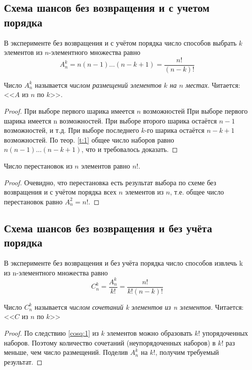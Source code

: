 \subsection{Схема шансов без возвращения и с учетом порядка}
\begin{theorem}
В эксперименте без возвращения и с учётом порядка число способов выбрать $k$ элементов из $n$-элементного множества равно
\begin{equation*}
	A_n^k=n(n-1)\dots(n-k+1)=\frac{n!}{(n-k)!}
\end{equation*}
\end{theorem}
Число $A_n^k$ называется \textit{числом размещений элементов $k$ на $n$ местах}. Читается: <<$A$ из $n$ по $k$>>.  

\begin{proof}
При выборе первого шарика имеется $n$ возможностей При выборе первого шарика имеется n возможностей. При выборе второго шарика остаётся $n−1$ возможностей, и т.д. При выборе последнего $k$-го шарика остаётся $n − k + 1$ возможностей. По теор. \ref{t:1} общее
число наборов равно $n(n−1)\dots(n−k +1)$, что и требовалось доказать.
\end{proof}

\begin{consq}
\label{cosq:1}
Число перестановок из $n$ элементов равно $n!$.
\end{consq}

\begin{proof}
Очевидно, что перестановка есть результат выбора по схеме без возвращения и с учётом порядка всех $n$ элементов из $n$, т.е. общее
число перестановок равно $A_n^2=n!$.
\end{proof}
\subsection{Схема шансов без возвращения и без учёта порядка}
\begin{theorem}
\label{t:2}
В эксперименте без возвращения и без учёта порядка число
способов извлечь k из n-элементного множества равно
\begin{equation*}
	C_n^k=\frac{A_n^k}{k!}=\frac{n!}{k!(n-k)!}
\end{equation*}
	
Число $C_n^k$ называется \textit{числом сочетаний k элементов из n элементов.}
Читается: <<$C$ из $n$ по $k$>>
\end{theorem}

\begin{proof}
По следствию \ref{cosq:1} из $k$ элементов можно образовать $k!$ упорядоченных наборов. Поэтому количество сочетаний 
(неупорядоченных наборов)
в $k!$ раз меньше, чем число размещений. Поделив $A^k_
n$ на $k!$, получим требуемый результат.
\end{proof}

